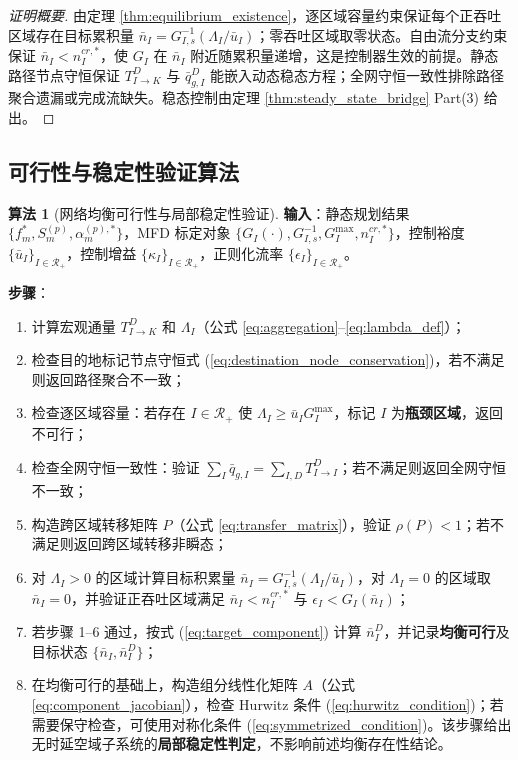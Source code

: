 \documentclass[a4paper,12pt]{article}
\theoremstyle{plain}
\theoremstyle{definition}
\newtheorem{algorithm}[theorem]{算法}
\theoremstyle{remark}
\begin{document}
\begin{proof}[证明概要]
由定理 \ref{thm:equilibrium_existence}，逐区域容量约束保证每个正吞吐区域存在目标累积量 $\bar{n}_I = G_{I,s}^{-1}(\Lambda_I/\bar u_I)$；零吞吐区域取零状态。自由流分支约束保证 $\bar{n}_I < n_I^{cr,*}$，使 $G_I$ 在 $\bar n_I$ 附近随累积量递增，这是控制器生效的前提。静态路径节点守恒保证 $T_{I\to K}^D$ 与 $\bar q_{g,I}^D$ 能嵌入动态稳态方程；全网守恒一致性排除路径聚合遗漏或完成流缺失。稳态控制由定理 \ref{thm:steady_state_bridge} Part(3) 给出。
\end{proof}

\subsection{可行性与稳定性验证算法}

\begin{algorithm}[网络均衡可行性与局部稳定性验证]\label{alg:network_feasibility_stability}
\textbf{输入}：静态规划结果 $\{f_m^*, S_m^{(p)}, \alpha_m^{(p),*}\}$，MFD 标定对象 $\{G_I(\cdot),G_{I,s}^{-1},G_I^{\max}, n_I^{cr,*}\}$，控制裕度 $\{\bar u_I\}_{I\in\mathcal R_+}$，控制增益 $\{\kappa_I\}_{I\in\mathcal R_+}$，正则化流率 $\{\epsilon_I\}_{I\in\mathcal R_+}$。

\textbf{步骤}：
\begin{enumerate}
    \item 计算宏观通量 $T_{I \to K}^D$ 和 $\Lambda_I$（公式 \ref{eq:aggregation}--\ref{eq:lambda_def}）；
    \item 检查目的地标记节点守恒式 (\ref{eq:destination_node_conservation})，若不满足则返回路径聚合不一致；
    \item 检查逐区域容量：若存在 $I\in\mathcal R_+$ 使 $\Lambda_I \ge \bar u_I G_I^{\max}$，标记 $I$ 为\textbf{瓶颈区域}，返回不可行；
    \item 检查全网守恒一致性：验证 $\sum_I \bar{q}_{g,I} = \sum_{I,D} T_{I \to I}^D$；若不满足则返回全网守恒不一致；
    \item 构造跨区域转移矩阵 $P$（公式 \ref{eq:transfer_matrix}），验证 $\rho(P)<1$；若不满足则返回跨区域转移非瞬态；
    \item 对 $\Lambda_I>0$ 的区域计算目标积累量 $\bar{n}_I = G_{I,s}^{-1}(\Lambda_I/\bar u_I)$，对 $\Lambda_I=0$ 的区域取 $\bar n_I=0$，并验证正吞吐区域满足 $\bar{n}_I < n_I^{cr,*}$ 与 $\epsilon_I<G_I(\bar n_I)$；
    \item 若步骤 1--6 通过，按式 (\ref{eq:target_component}) 计算 $\bar n_I^D$，并记录\textbf{均衡可行}及目标状态 $\{\bar{n}_I, \bar{n}_I^D\}$；
    \item 在均衡可行的基础上，构造组分线性化矩阵 $A$（公式 \ref{eq:component_jacobian}），检查 Hurwitz 条件 (\ref{eq:hurwitz_condition})；若需要保守检查，可使用对称化条件 (\ref{eq:symmetrized_condition})。该步骤给出无时延空域子系统的\textbf{局部稳定性判定}，不影响前述均衡存在性结论。
\end{enumerate}


\end{algorithm}
\end{document}
